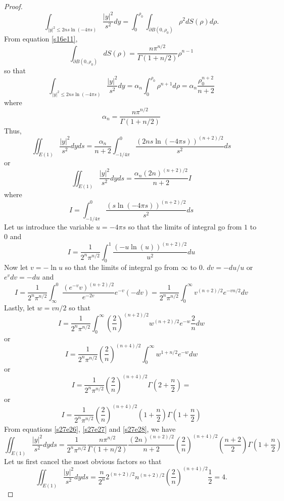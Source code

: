 \documentclass{article}
\theoremstyle{plain}
\numberwithin{thm}{section}
\theoremstyle{plain}
\numberwithin{prop}{section}
\theoremstyle{definition}
\numberwithin{defn}{section}
\theoremstyle{remark}
\numberwithin{equation}{section}
\begin{document}
\begin{proof}
\[
\int_{|y|^2 \le 2ns\ln(-4\pi s)}\frac{|y|^2}{s^2}dy = 
\int_0^{\rho_0}\int_{\partial B(0, \rho_0)} \rho^2 dS(\rho)d\rho.
\]
From equation \eqref{s16e11},
\[
\int_{\partial B(0, \rho_0)} dS(\rho) = \frac{n\pi^{n/2}}{\Gamma(1 + n/2)}\rho^{n-1}
\]
so that
\begin{equation}\label{s27e25}
\int_{|y|^2 \le 2ns\ln(-4\pi s)}\frac{|y|^2}{s^2}dy = \alpha_n\int_0^{\rho_0} \rho^{n+1}d\rho = 
\alpha_n\frac{\rho_0^{n+2}}{n+2}
\end{equation}
where
\begin{equation}\label{s27e26}
\alpha_n = \frac{n\pi^{n/2}}{\Gamma(1 + n/2)}
\end{equation}
Thus,
\[
\iint_{E(1)}\frac{|y|^2}{s^2}dyds = \frac{\alpha_n}{n+2}\int_{-1/4\pi}^0\frac{(2ns\ln(-4\pi s))^{(n+2)/2}}{s^2}ds
\]
or
\begin{equation}\label{s27e27}
\iint_{E(1)}\frac{|y|^2}{s^2}dyds = \frac{\alpha_n(2n)^{(n+2)/2}}{n+2} I
\end{equation}
where
\[
I = \int_{-1/4\pi}^0\frac{(s\ln(-4\pi s))^{(n+2)/2}}{s^2}ds
\]
Let us introduce the variable $u = -4\pi s$ so that the limits of integral go from $1$ to $0$ and
\[
I = \frac{1}{2^n\pi^{n/2}}\int_0^1\frac{(-u\ln(u))^{(n+2)/2}}{u^2}du
\]
Now let $v = -\ln u$ so that the limits of integral go from $\infty$ to $0$. $dv = -du/u$ or $e^{v}dv = -du$ and
\[
I = \frac{1}{2^n\pi^{n/2}}\int_{\infty}^0 \frac{(e^{-v}v)^{(n+2)/2}}{e^{-2v}}e^{-v}(-dv)
= \frac{1}{2^n\pi^{n/2}}\int_0^\infty v^{(n+2)/2}e^{-vn/2}dv
\]
Lastly, let $w = vn/2$ so that
\[
I = \frac{1}{2^n\pi^{n/2}}\int_0^\infty \left(\frac{2}{n}\right)^{(n+2)/2}w^{(n+2)/2}e^{-w}\frac{2}{n}dw
\]
or
\[
I = \frac{1}{2^n\pi^{n/2}}\left(\frac{2}{n}\right)^{(n+4)/2}\int_0^\infty w^{1 + n/2}e^{-w}dw
\]
or
\[
I = \frac{1}{2^n\pi^{n/2}}\left(\frac{2}{n}\right)^{(n+4)/2}\Gamma\left(2 + \frac{n}{2}\right) =
\]
or
\begin{equation}\label{s27e28}
I =  
\frac{1}{2^n\pi^{n/2}}\left(\frac{2}{n}\right)^{(n+4)/2}\left(1 + \frac{n}{2}\right)
\Gamma\left(1 + \frac{n}{2}\right)
\end{equation}
From equations \eqref{s27e26}, \eqref{s27e27} and \eqref{s27e28}, we have
\[
\iint_{E(1)}\frac{|y|^2}{s^2}dyds = 
\frac{1}{2^n\pi^{n/2}}
\frac{n\pi^{n/2}}{\Gamma(1 + n/2)}\frac{(2n)^{(n+2)/2}}{n+2}\left(\frac{2}{n}\right)^{(n+4)/2}
\left(\frac{n+2}{2}\right)\Gamma\left(1 + \frac{n}{2}\right)
\]
Let us first cancel the most obvious factors so that
\[
\iint_{E(1)}\frac{|y|^2}{s^2}dyds =
\frac{n}{2^n}2^{(n+2)/2}n^{(n+2)/2}\left(\frac{2}{n}\right)^{(n+4)/2}\frac{1}{2} = 4.
\]
\end{proof}
\end{document}
